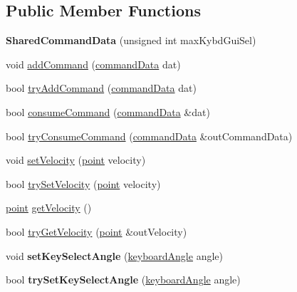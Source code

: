 \subsection*{Public Member Functions}
\begin{DoxyCompactItemize}
\item 
\hypertarget{class_shared_command_data_a3923aef67267c3f32ba84a458f56a8d5}{{\bfseries Shared\+Command\+Data} (unsigned int max\+Kybd\+Gui\+Sel)}\label{class_shared_command_data_a3923aef67267c3f32ba84a458f56a8d5}

\item 
void \hyperlink{class_shared_command_data_a7c2de829c0cd0243e65070df13e1ec73}{add\+Command} (\hyperlink{structcommand_data}{command\+Data} dat)
\item 
bool \hyperlink{class_shared_command_data_a468e88e90b272c6eed02e93a390f5ee4}{try\+Add\+Command} (\hyperlink{structcommand_data}{command\+Data} dat)
\item 
bool \hyperlink{class_shared_command_data_a4da8ee2c7461ec2b67343b6f2e63f70a}{consume\+Command} (\hyperlink{structcommand_data}{command\+Data} \&dat)
\item 
bool \hyperlink{class_shared_command_data_a6c865acfe805a27cd6c052a58168b7d5}{try\+Consume\+Command} (\hyperlink{structcommand_data}{command\+Data} \&out\+Command\+Data)
\item 
void \hyperlink{class_shared_command_data_a8c130b9d388e0f3a13502eb8e3883cbc}{set\+Velocity} (\hyperlink{structpoint}{point} velocity)
\item 
bool \hyperlink{class_shared_command_data_aedc5a949136ed05b8c3be82a48832e78}{try\+Set\+Velocity} (\hyperlink{structpoint}{point} velocity)
\item 
\hyperlink{structpoint}{point} \hyperlink{class_shared_command_data_a6fef1c13e01cda4c6f5ac0687f0e3ffd}{get\+Velocity} ()
\item 
bool \hyperlink{class_shared_command_data_ab79b6d4462e1d84adc840da69fd5d91f}{try\+Get\+Velocity} (\hyperlink{structpoint}{point} \&out\+Velocity)
\item 
\hypertarget{class_shared_command_data_a4e1c7c8df03be9ddee81266f8a6e2547}{void {\bfseries set\+Key\+Select\+Angle} (\hyperlink{structkeyboard_angle}{keyboard\+Angle} angle)}\label{class_shared_command_data_a4e1c7c8df03be9ddee81266f8a6e2547}

\item 
\hypertarget{class_shared_command_data_a3071d3c36b1dd437828273a95b1101b2}{bool {\bfseries try\+Set\+Key\+Select\+Angle} (\hyperlink{structkeyboard_angle}{keyboard\+Angle} angle)}\label{class_shared_command_data_a3071d3c36b1dd437828273a95b1101b2}


\end{DoxyCompactItemize}
